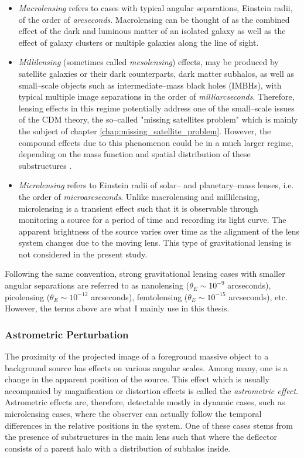 \documentclass[paper=a4, fontsize=11pt]{scrartcl} %
\numberwithin{equation}{section} %
\numberwithin{figure}{section} %
\numberwithin{table}{section} %
\begin{document}
\begin{itemize} 
\item \emph{Macrolensing} refers to cases with typical angular separations, Einstein radii, of the order of \emph{arcseconds}. Macrolensing can be thought of as the combined effect of the dark and luminous matter of an isolated galaxy as well as the effect of galaxy clusters or multiple galaxies along the line of sight. 
\item \emph{Millilensing} (sometimes called \emph{mesolensing}) effects, may be produced by satellite galaxies or their dark counterparts, dark matter subhalos, as well as small--scale objects such as intermediate--mass black holes (IMBHs), with typical multiple image separations in the order of \emph{milliarcseconds}. Therefore, lensing effects in this regime potentially address one of the small--scale issues of the CDM theory, the so--called "missing satellites problem" which is mainly the subject of chapter \ref{chap:missing_satellite_problem}. However, the compound effects due to this phenomenon could be in a much larger regime, depending on the mass function and spatial distribution of these substructures \citet{Treu10}.
\item \emph{Microlensing} refers to Einstein radii of solar-- and planetary--mass lenses, i.e. the order of \emph{microarcseconds}. Unlike macrolensing and millilensing, microlensing is a transient effect such that it is observable through monitoring a source for a period of time and recording its light curve. The apparent brightness of the source varies over time as the alignment of the lens system changes due to the moving lens. This type of gravitational lensing is not considered in the present study.
\end{itemize}

Following the same convention, strong gravitational lensing cases with smaller angular separations are referred to as nanolensing ($\theta_E \sim 10^{-9}$ arcseconds), picolensing ($\theta_E \sim 10^{-12}$ arcseconds), femtolensing ($\theta_E \sim 10^{-15}$ arcseconds), etc. However, the terms above are what I mainly use in this thesis.

 \subsubsection{Astrometric Perturbation}
 The proximity of the projected image of a foreground massive object to a background source has effects on various angular scales. Among many, one is a change in the apparent position of the source. This effect which is usually accompanied by magnification or distortion effects is called the \emph{astrometric effect}. Astrometric effects are, therefore, detectable mostly in dynamic cases, such as microlensing cases, where the observer can actually follow the temporal differences in the relative positions in the system. One of these cases stems from the presence of substructures in the main lens such that where the deflector consists of a parent halo with a distribution of subhalos inside. 
 
\end{document}
